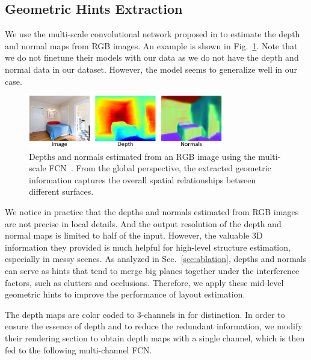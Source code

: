 \subsection{Geometric Hints Extraction}
\label{sec:depth_normal}

We use the multi-scale convolutional network proposed in \cite{eigen2015predicting} to estimate the depth and normal maps from RGB images.
An example is shown in Fig.~\ref{fig:depthandnormal}. 
Note that we do not finetune their models with our data as we do not have the depth and normal data in our dataset.
However, the model seems to generalize well in our case. 
%

\begin{figure}
	\centering
	\includegraphics[width=8.5cm]{figure/DN.png}
	\caption{Depths and normals estimated from an RGB image using the multi-scale FCN~\cite{eigen2015predicting}. From the global perspective, the extracted geometric information captures the overall spatial relationships between different surfaces. }
	\label{fig:depthandnormal}
\end{figure}

We notice in practice that the depths and normals estimated from RGB images are not precise in local details. And the output resolution of the depth and normal maps is limited to half of the input. However, the valuable 3D information they provided is much helpful for high-level structure estimation, especially in messy scenes.  
%
As analyzed in Sec.~\ref{sec:ablation}, depths and normals can serve as hints that tend to merge big planes together under the interference factors, such as clutters and occlusions. 
%
Therefore, we apply these mid-level geometric hints to improve the performance of layout estimation. 
%


The depth maps are color coded to 3-channels in \cite{eigen2015predicting} for distinction. In order to ensure the essence of depth and to reduce the redundant information, we modify their rendering section to obtain depth maps with a single channel, which is then fed to the following multi-channel FCN.

